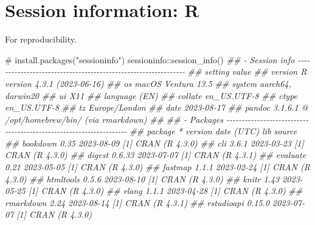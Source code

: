 \documentclass[
  10pt,
  a4paper,
]{book}
\newenvironment{Shaded}{\begin{snugshade}}{\end{snugshade}}
\newcommand{\CommentTok}[1]{\textcolor[rgb]{0.37,0.37,0.37}{#1}}
\newcommand{\DocumentationTok}[1]{\textcolor[rgb]{0.37,0.37,0.37}{\textit{#1}}}
\newcommand{\FunctionTok}[1]{\textcolor[rgb]{0.28,0.35,0.67}{#1}}
\newcommand{\NormalTok}[1]{\textcolor[rgb]{0.00,0.46,0.62}{#1}}
\newcommand{\SpecialCharTok}[1]{\textcolor[rgb]{0.37,0.37,0.37}{#1}}
\begin{document}
\hypertarget{session-information-r}{%
\chapter*{Session information: R}\label{session-information-r}}

For reproducibility.

\begin{Shaded}
\begin{Highlighting}[]
\CommentTok{\# install.packages("sessioninfo")}
\NormalTok{sessioninfo}\SpecialCharTok{::}\FunctionTok{session\_info}\NormalTok{()}
\DocumentationTok{\#\# {-} Session info {-}{-}{-}{-}{-}{-}{-}{-}{-}{-}{-}{-}{-}{-}{-}{-}{-}{-}{-}{-}{-}{-}{-}{-}{-}{-}{-}{-}{-}{-}{-}{-}{-}{-}{-}{-}{-}{-}{-}{-}{-}{-}{-}{-}{-}{-}{-}{-}{-}{-}{-}{-}{-}{-}{-}{-}{-}{-}{-}{-}{-}{-}{-}}
\DocumentationTok{\#\#  setting  value}
\DocumentationTok{\#\#  version  R version 4.3.1 (2023{-}06{-}16)}
\DocumentationTok{\#\#  os       macOS Ventura 13.5}
\DocumentationTok{\#\#  system   aarch64, darwin20}
\DocumentationTok{\#\#  ui       X11}
\DocumentationTok{\#\#  language (EN)}
\DocumentationTok{\#\#  collate  en\_US.UTF{-}8}
\DocumentationTok{\#\#  ctype    en\_US.UTF{-}8}
\DocumentationTok{\#\#  tz       Europe/London}
\DocumentationTok{\#\#  date     2023{-}08{-}17}
\DocumentationTok{\#\#  pandoc   3.1.6.1 @ /opt/homebrew/bin/ (via rmarkdown)}
\DocumentationTok{\#\# }
\DocumentationTok{\#\# {-} Packages {-}{-}{-}{-}{-}{-}{-}{-}{-}{-}{-}{-}{-}{-}{-}{-}{-}{-}{-}{-}{-}{-}{-}{-}{-}{-}{-}{-}{-}{-}{-}{-}{-}{-}{-}{-}{-}{-}{-}{-}{-}{-}{-}{-}{-}{-}{-}{-}{-}{-}{-}{-}{-}{-}{-}{-}{-}{-}{-}{-}{-}{-}{-}{-}{-}{-}{-}}
\DocumentationTok{\#\#  package     * version date (UTC) lib source}
\DocumentationTok{\#\#  bookdown      0.35    2023{-}08{-}09 [1] CRAN (R 4.3.0)}
\DocumentationTok{\#\#  cli           3.6.1   2023{-}03{-}23 [1] CRAN (R 4.3.0)}
\DocumentationTok{\#\#  digest        0.6.33  2023{-}07{-}07 [1] CRAN (R 4.3.1)}
\DocumentationTok{\#\#  evaluate      0.21    2023{-}05{-}05 [1] CRAN (R 4.3.0)}
\DocumentationTok{\#\#  fastmap       1.1.1   2023{-}02{-}24 [1] CRAN (R 4.3.0)}
\DocumentationTok{\#\#  htmltools     0.5.6   2023{-}08{-}10 [1] CRAN (R 4.3.0)}
\DocumentationTok{\#\#  knitr         1.43    2023{-}05{-}25 [1] CRAN (R 4.3.0)}
\DocumentationTok{\#\#  rlang         1.1.1   2023{-}04{-}28 [1] CRAN (R 4.3.0)}
\DocumentationTok{\#\#  rmarkdown     2.24    2023{-}08{-}14 [1] CRAN (R 4.3.1)}
\DocumentationTok{\#\#  rstudioapi    0.15.0  2023{-}07{-}07 [1] CRAN (R 4.3.0)}

\end{Highlighting}
\end{Shaded}
\end{document}
